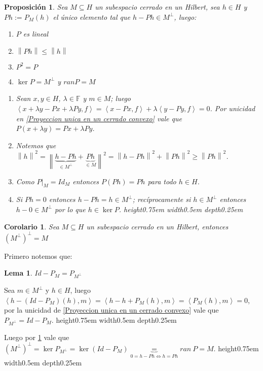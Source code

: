 \documentclass[11pt]{article}
\newcommand{\norm}[1]{\left\lVert#1\right\rVert}
\newcommand{\ip}[1]{\left\langle#1\right\rangle}
\numberwithin{theorem}{subsection}
\newtheorem{lemma}[theorem]{Lema}
\newtheorem{proposition}[theorem]{Proposici\'on}
\newtheorem{corollary}[theorem]{Corolario}
\newenvironment{proof}[1][Demostraci\'on]{\begin{trivlist}
		\item[\hskip \labelsep {\bfseries #1}]}{\end{trivlist}}
\newcommand{\qed}{\nobreak \ifvmode \relax \else
	\ifdim\lastskip<1.5em \hskip-\lastskip
	\hskip1.5em plus0em minus0.5em \fi \nobreak
	\vrule height0.75em width0.5em depth0.25em\fi}
\begin{document}
\begin{proposition}
	\label{Propiedades proyeccion ortogonal}
	Sea $M \subseteq H$ un subespacio cerrado en un Hilbert, sea $h \in H$ y $Ph := P_M(h)$ el \'unico elemento tal que $h - Ph \in M^{\perp}$, luego:
	
	\begin{enumerate}
		\item $P$ es lineal
		\item $\norm{Ph} \leq \norm{h}$
		\item $P^2 = P$
		\item $\ker P = M^{\perp}$ y $ran P = M$
	\end{enumerate}
	
	\begin{proof}
		\begin{enumerate}
			\item Sean $x,y \in H$, $\lambda \in \mathbb{F}$ y $m \in M$; luego $\ip{x + \lambda y - Px + \lambda Py, f} = \ip{x -Px,f} + \lambda \ip{y - Py,f} = 0$. Por unicidad en \ref{Proyeccion unica en un cerrado convexo} vale que $P(x + \lambda y) = Px + \lambda Py$.
		
		\item Notemos que $\norm{h}^2 = \norm{\underbrace{h - Ph}_{\in M^{\perp}} + \underbrace{Ph}_{\in M}}^2 = \norm{h-Ph}^2 + \norm{Ph}^2 \geq \norm{Ph}^2$.
		
		\item Como $P\vert_M = Id_M$ entonces $P(Ph) = Ph$ para todo $h \in H$.
		
		\item Si $Ph = 0$ entonces $h - Ph = h \in M^{\perp}$; rec\'iprocamente si $h \in M^{\perp}$ entonces $h-0 \in M^{\perp}$ por lo que $h \in \ker P$. \qed
	\end{enumerate}
	\end{proof}
	
\end{proposition}

\begin{corollary}
	Sea $M \subseteq H$ un subespacio cerrado en un Hilbert, entonces $(M^{\perp})^{\perp} = M$
\end{corollary}

\begin{proof}
	Primero notemos que:
	
	\begin{lemma}
		$Id - P_M = P_{M^{\perp}}$
	\end{lemma}
	
	\begin{proof}[Demostraci\'on del lema]
		Sea $m \in M^{\perp}$ y $h \in H$, luego $\ip{h - (Id - P_M)(h),m} = \ip{h - h + P_M(h),m} = \ip{P_M(h),m} = 0$, por la unicidad de \ref{Proyeccion unica en un cerrado convexo} vale que $P_{M^{\perp}} = Id - P_M$. \qed
	\end{proof}
	
	Luego por \ref{Propiedades proyeccion ortogonal} vale que $\left(M^{\perp}\right)^{\perp} = \ker P_{M^{\perp}} = \ker (Id - P_M) \underbrace{=}_{0 = h - Ph \Leftrightarrow h = Ph } ran \ P = M$. \qed
	
\end{proof}
\end{document}

